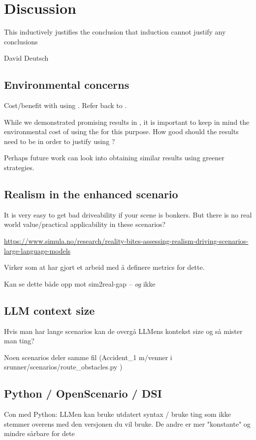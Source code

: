 
\chapter{Discussion}

\epigraph{This inductively justifies the conclusion that induction cannot justify any conclusions}{David Deutsch}

\section{Environmental concerns}
Cost/benefit with using . Refer back to .

While we demonstrated promising results in , it is important to keep in mind the
environmental cost of using the  for this purpose. How good should the results need
to be in order to justify using ?

Perhaps future work can look into obtaining similar results using greener strategies.

\section{Realism in the enhanced scenario}

It is very easy to get bad driveability if your scene is bonkers. But there is no real world
value/practical applicability in these scenarios?

\url{https://www.simula.no/research/reality-bites-assessing-realism-driving-scenarios-large-language-models}

Virker som at \cite{LLMScenarioChang24} har gjort et arbeid med å definere metrics for dette.

Kan se dette både opp mot sim2real-gap -- \emph{og} ikke


\section{LLM context size}

Hvis man har lange scenarios kan de overgå LLMens kontekst size og så mister man ting?

Noen scenarios deler samme fil (Accident\_1 m/venner i srunner/scenarios/route\_obstacles.py )

\section{Python / OpenScenario / DSI}

Con med Python: LLMen kan bruke utdatert syntax / bruke ting som ikke stemmer overens med den
versjonen du vil bruke. De andre er mer "konstante" og mindre sårbare for dete